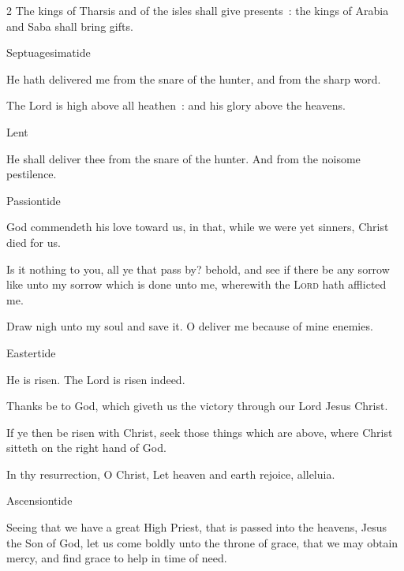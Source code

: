\begin{multicols}{2}
    The kings of Tharsis and of the isles shall give presents~: the kings of Arabia and Saba shall bring gifts.\\

\centerline{\color{RubricRed}\small%
Septuagesimatide}
\par\noindent
He hath delivered me from the snare of the hunter, and from the sharp word.

The Lord is high above all heathen~: and his glory above the heavens.\\

\centerline{\color{RubricRed}\small%
Lent}
\par\noindent
    He shall deliver thee from the snare of the hunter. And from the noisome pestilence.\\

\centerline{\color{RubricRed}\small%
Passiontide}
\par\noindent
    God commendeth his love toward us, in that, while we were yet sinners, Christ died for us.\par
    Is it nothing to you, all ye that pass by? behold, and see if there be any sorrow like unto my sorrow which is done unto me, wherewith the \textsc{Lord} hath afflicted me.\par
Draw nigh unto my soul and save it. O deliver me because of mine enemies.\\

\centerline{\color{RubricRed}\small%
Eastertide}
\par\noindent
    He is risen. The Lord is risen indeed.\par
    Thanks be to God, which giveth us the victory through our Lord Jesus Christ.\par
    If ye then be risen with Christ, seek those things which are above, where Christ sitteth on the right hand of God.\par
    In thy resurrection, O Christ, Let heaven and earth rejoice, alleluia.\\

\centerline{\color{RubricRed}\small%
Ascensiontide}
\par\noindent
    Seeing that we have a great High Priest, that is passed into the heavens, Jesus the Son of God, let us come boldly unto the throne of grace, that we may obtain mercy, and find grace to help in time of need.\par
    

\end{multicols}
